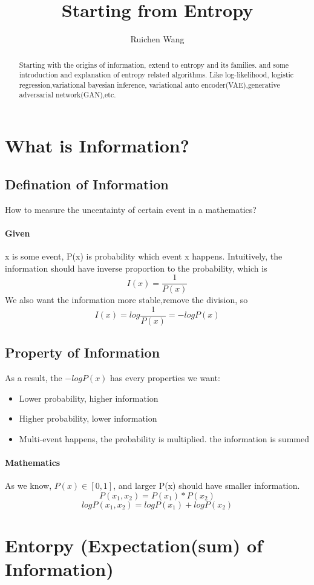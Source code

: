 \documentclass{article}
\author{Ruichen Wang}
\title{Starting from Entropy}
\begin{document}
\maketitle


\begin{abstract}
Starting with the origins of information, extend to entropy and its families. and some introduction and explanation of entropy related algorithms. Like log-likelihood, logistic regression,variational bayesian inference, variational auto encoder(VAE),generative adversarial network(GAN),etc.
\end{abstract}

\tableofcontents
\section{What is Information?} 
\subsection{Defination of Information}
How to measure the uncentainty of certain event in a mathematics?
\paragraph{Given} x is some event, P(x) is probability which event x happens. Intuitively, the information should have inverse proportion to the probability, which is 
$$I(x)=\frac{1}{P(x)}$$
We also want the information more stable,remove the division, so
$$I(x)=log\frac{1}{P(x)}=-logP(x)$$
\subsection{Property of Information}
As a result, the $-logP(x)$ has every properties we want:
\begin{itemize}
\item Lower probability, higher information
\item Higher probability, lower information
\item Multi-event happens, the probability is multiplied. the information is summed
\end{itemize}
\paragraph{Mathematics}
As we know, $P(x) \in [0,1]$, and larger P(x) should have smaller information.
$$P(x_{1},x_{2})=P(x_{1})*P(x_{2})$$
$$logP(x_{1},x_{2})=logP(x_{1})+logP(x_{2})$$
\section{Entorpy (Expectation(sum) of Information)}
\end{document}
